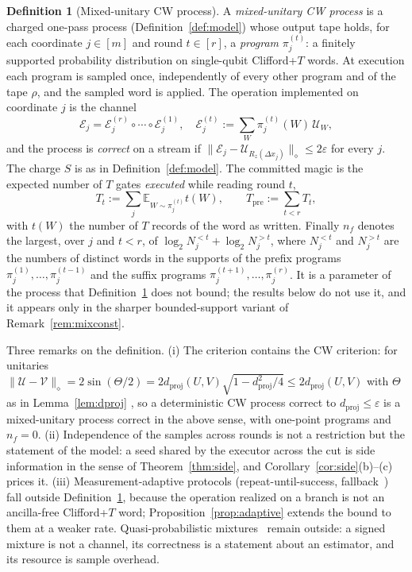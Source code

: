 \documentclass[aps,prx,twocolumn,superscriptaddress,nofootinbib,longbibliography]{revtex4-2}
\theoremstyle{plain}
\theoremstyle{definition}
\newtheorem{definition}{Definition}
\theoremstyle{remark}
\newcommand{\dproj}{d_{\mathrm{proj}}}
\newcommand{\Tpre}{T_{\mathrm{pre}}}
\newcommand{\E}{\mathbb{E}}
\begin{document}
\setcounter{definition}{2}
\begin{definition}[Mixed-unitary CW process]\label{def:mixed}
A \emph{mixed-unitary CW process} is a charged one-pass process (Definition~\ref{def:model}) whose output tape holds, for each coordinate $j\in[m]$ and round $t\in[r]$, a \emph{program} $\pi^{(t)}_j$: a finitely supported probability distribution on single-qubit Clifford+$T$ words. At execution each program is sampled once, independently of every other program and of the tape $\rho$, and the sampled word is applied. The operation implemented on coordinate $j$ is the channel
\begin{equation}
\mathcal E_j=\mathcal E^{(r)}_j\circ\cdots\circ\mathcal E^{(1)}_j,\quad
\mathcal E^{(t)}_j:=\sum_{W}\pi^{(t)}_j(W)\,\mathcal U_W,
\end{equation}
and the process is \emph{correct} on a stream if $\|\mathcal E_j-\mathcal U_{R_z(\Delta x_j)}\|_\diamond\le2\varepsilon$ for every $j$. The charge $S$ is as in Definition~\ref{def:model}. The committed magic is the expected number of $T$ gates \emph{executed} while reading round $t$,
\begin{equation}
T_t:=\sum_j\E_{W\sim\pi^{(t)}_j}t(W),\qquad\Tpre:=\sum_{t<r}T_t,
\end{equation}
with $t(W)$ the number of $T$ records of the word as written. Finally $n_f$ denotes the largest, over $j$ and $t<r$, of $\log_2N^{<t}_j+\log_2N^{>t}_j$, where $N^{<t}_j$ and $N^{>t}_j$ are the numbers of distinct words in the supports of the prefix programs $\pi^{(1)}_j,\dots,\pi^{(t-1)}_j$ and the suffix programs $\pi^{(t+1)}_j,\dots,\pi^{(r)}_j$. It is a parameter of the process that Definition~\ref{def:mixed} does not bound; the results below do not use it, and it appears only in the sharper bounded-support variant of Remark~\ref{rem:mixconst}.
\end{definition}
\setcounter{definition}{0}

Three remarks on the definition. (i) The criterion contains the CW criterion: for unitaries $\|\mathcal U-\mathcal V\|_\diamond=2\sin(\Theta/2)=2\dproj(U,V)\sqrt{1-\dproj^2/4}\le2\dproj(U,V)$ with $\Theta$ as in Lemma~\ref{lem:dproj} \cite[Thm.~3.55]{Watrous}, so a deterministic CW process correct to $\dproj\le\varepsilon$ is a mixed-unitary process correct in the above sense, with one-point programs and $n_f=0$. (ii) Independence of the samples across rounds is not a restriction but the statement of the model: a seed shared by the executor across the cut is side information in the sense of Theorem~\ref{thm:side}, and Corollary~\ref{cor:side}(b)--(c) prices it. (iii) Measurement-adaptive protocols (repeat-until-success, fallback~\cite{BRS,KLMPP}) fall outside Definition~\ref{def:mixed}, because the operation realized on a branch is not an ancilla-free Clifford+$T$ word; Proposition~\ref{prop:adaptive} extends the bound to them at a weaker rate. Quasi-probabilistic mixtures~\cite{Bothe} remain outside: a signed mixture is not a channel, its correctness is a statement about an estimator, and its resource is sample overhead.
\end{document}
